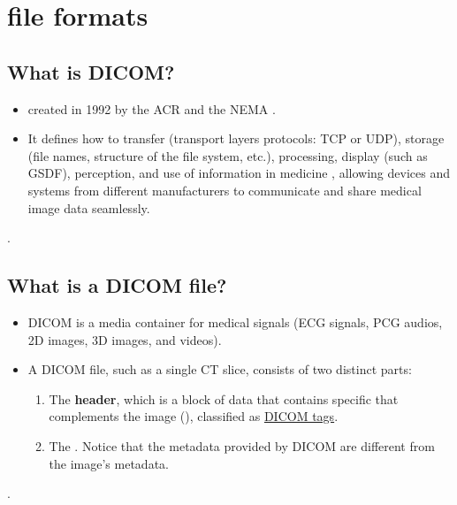 \chapter{ file formats}

\section{What is DICOM?}
\begin{itemize}
\item {}
   created in 1992 by
  the \gls{ACR} and the \gls{NEMA} \cite{DICOM2025,wikipedia_DICOM}.
\item It defines how to transfer (transport layers protocols:
  \gls{TCP} or \gls{UDP}), storage (file names, structure of the
  file system, etc.), processing, display (such as \gls{GSDF}),
  perception, and use of information in medicine
  \cite{bushberg2011essential}, allowing devices and systems from
  different manufacturers to communicate and share medical image data
  seamlessly.
\end{itemize}.

\section{What is a DICOM file?}
\begin{itemize}
\item \gls{DICOM} is a media container for medical signals
  (\gls{ECG} signals, \gls{PCG} audios, 2D images, 3D images, and videos).
\item A DICOM file, such as a single CT slice, consists of two
  distinct parts:
  \begin{enumerate}
  \item The \textbf{header}, which is a block of data that contains specific
      that complements the image
    (), classified as
    \href{https://dicom.nema.org/medical/dicom/current/output/html/part06.html#PS3.6}{DICOM
      tags}.
  \item The . Notice that the metadata provided by \gls{DICOM} are
    different from the image's metadata.
  \end{enumerate}
\end{itemize}.

